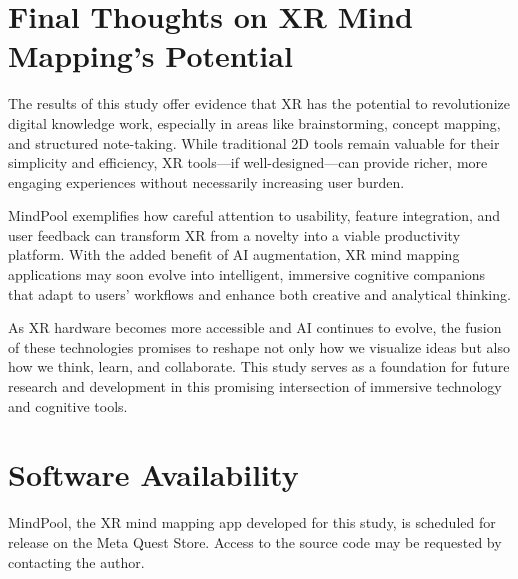 \documentclass{CPP}
\begin{document}
\section{Final Thoughts on XR Mind Mapping’s Potential}

The results of this study offer evidence that XR has the potential to revolutionize digital knowledge work, especially in areas like brainstorming, concept mapping, and structured note-taking. While traditional 2D tools remain valuable for their simplicity and efficiency, XR tools—if well-designed—can provide richer, more engaging experiences without necessarily increasing user burden.

MindPool exemplifies how careful attention to usability, feature integration, and user feedback can transform XR from a novelty into a viable productivity platform. With the added benefit of AI augmentation, XR mind mapping applications may soon evolve into intelligent, immersive cognitive companions that adapt to users’ workflows and enhance both creative and analytical thinking.

As XR hardware becomes more accessible and AI continues to evolve, the fusion of these technologies promises to reshape not only how we visualize ideas but also how we think, learn, and collaborate. This study serves as a foundation for future research and development in this promising intersection of immersive technology and cognitive tools.

\section{Software Availability}

MindPool, the XR mind mapping app developed for this study, is scheduled for release on the Meta Quest Store. Access to the source code may be requested by contacting the author.





\end{document}
